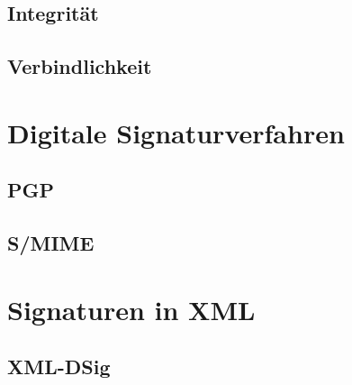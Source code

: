 \subsection{Integrität}

\subsection{Verbindlichkeit}

\section{Digitale Signaturverfahren}
\label{sec:thg:dsv}


\subsection{PGP}
\label{sec:thg:dsv:pgp}

\subsection{S/MIME}
\label{sec:thg:dsv:smime}


\section{Signaturen in XML}
\label{sec:thg:xml}


\subsection{XML-DSig}
\label{sec:thg:xml:dsig}
